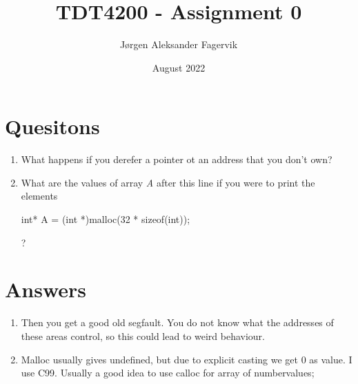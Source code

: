 \documentclass{article}
\title{TDT4200 - Assignment 0}
\author{Jørgen Aleksander Fagervik}
\date{August 2022}
\begin{document}
\maketitle

\section{Quesitons}
\begin{enumerate}
  \item What happens if you derefer a pointer ot an address that you don't own?
  \item What are the values of array \textit{A} after this line if you were to 
    print the elements 
    \begin{listing}
      int* A = (int *)malloc(32 * sizeof(int));  
    \end{listing} 
    ?
\end{enumerate}

\section{Answers}

\begin{enumerate}
  \item Then you get a good old segfault. You do not know what the addresses of these
    areas control, so this could lead to weird behaviour. 
  \item Malloc usually gives undefined, but due to explicit casting we get 0 as value. I use C99.
    Usually a good idea to use calloc for array of numbervalues;
\end{enumerate}
\end{document}
